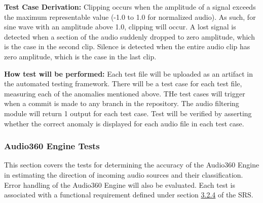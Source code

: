 \documentclass[12pt, titlepage]{article}
\begin{document}
\begin{enumerate}
\textbf{Test Case Derivation:} 
Clipping occurs when the amplitude of a signal exceeds the maximum representable
value (-1.0 to 1.0 for normalized audio). As such, for sine wave with an
amplitude above 1.0, clipping will occur. A lost signal is detected when a
section of the audio suddenly dropped to zero amplitude, which is the case in
the second clip. Silence is detected when the entire audio clip has zero
amplitude, which is the case in the last clip.

\textbf{How test will be performed:}
Each test file will be uploaded as an artifact in the automated testing
framework. There will be a test case for each test file, measuring each of the
anomalies mentioned above. THe test cases will trigger when a commit is made to
any branch in the repository. The audio filtering module will return 1 output
for each test case. Test will be verified by asserting whether the correct
anomaly is displayed for each audio file in each test case. 

\end{enumerate}


\subsubsection{Audio360 Engine Tests}

This section covers the tests for determining the accuracy of the Audio360
Engine in estimating the direction of incoming audio sources and their
classification. Error handling of the Audio360 Engine will also be evaluated.
Each test is associated with a functional requirement defined under section
\hyperref[SRS-sec:FR4]{3.2.4} of the SRS. 
\end{document}
